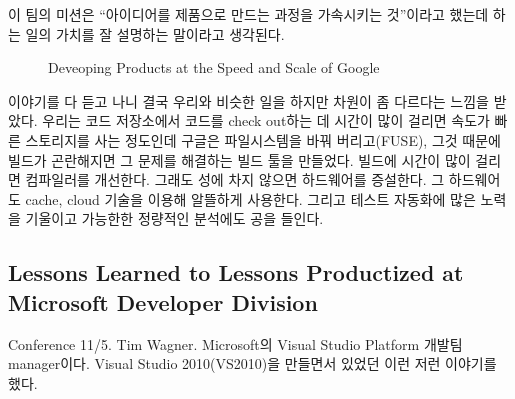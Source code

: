 \documentclass[11pt]{article}
\begin{document}
이 팀의 미션은 ``아이디어를 제품으로 만드는 과정을 가속시키는
것''이라고 했는데 하는 일의 가치를 잘 설명하는 말이라고 생각된다.

\begin{figure}[t]
    \begin{Frame}
        \begin{center}
        \end{center}
    \end{Frame}
    \caption{Deveoping Products at the Speed and Scale of Google}
    \label{google}
\end{figure}
 
이야기를 다 듣고 나니 결국 우리와 비슷한 일을 하지만 차원이 좀 다르다는
느낌을 받았다. 우리는 코드 저장소에서 코드를 check out하는 데 시간이 많이 
걸리면 속도가 빠른 스토리지를 사는 정도인데 구글은 파일시스템을 바꿔 
버리고(FUSE), 그것 때문에 빌드가 곤란해지면 그 문제를 해결하는 빌드 툴을 
만들었다. 빌드에 시간이 많이 걸리면 컴파일러를 개선한다. 그래도 성에 차지 
않으면 하드웨어를 증설한다. 그 하드웨어도 cache, cloud 기술을 이용해 알뜰하게 
사용한다. 그리고 테스트 자동화에 많은 노력을 기울이고 가능한한 정량적인 
분석에도 공을 들인다.

\subsection{Lessons Learned to Lessons Productized at
  Microsoft Developer Division}

Conference 11/5. Tim Wagner. Microsoft의 Visual Studio Platform 개발팀
manager이다. Visual Studio 2010(VS2010)을 만들면서 있었던 이런 저런 이야기를
했다. 
 
\end{document}
